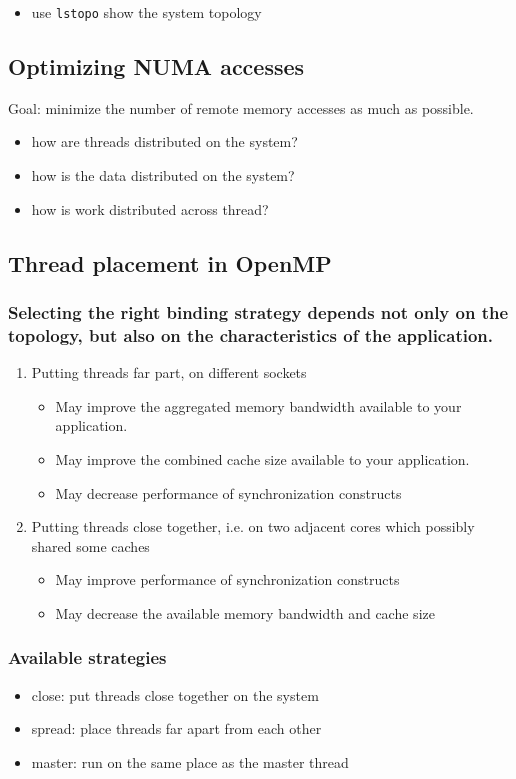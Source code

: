 \documentclass[11pt]{article}
\begin{document}
\begin{itemize}
\item use \verb~lstopo~ show the system topology
\end{itemize}
\subsection{Optimizing NUMA accesses}
\label{sec-1-2}
Goal: minimize the number of remote memory accesses as much as possible.
\begin{itemize}
\item how are threads distributed on the system?
\item how is the data distributed on the system?
\item how is work distributed across thread?
\end{itemize}

\subsection{Thread placement in OpenMP}
\label{sec-1-3}
\subsubsection{Selecting the right binding strategy depends not only on the topology, but also on the characteristics of the application.}
\label{sec-1-3-1}
\begin{enumerate}
\item Putting threads far part, on different sockets
\label{sec-1-3-1-1}
\begin{itemize}
\item May improve the aggregated memory bandwidth available to your application.
\item May improve the combined cache size available to your application.
\item May decrease performance of synchronization constructs
\end{itemize}
\item Putting threads close together, i.e. on two adjacent cores which possibly shared some caches
\label{sec-1-3-1-2}
\begin{itemize}
\item May improve performance of synchronization constructs
\item May decrease the available memory bandwidth and cache size
\end{itemize}
\end{enumerate}
\subsubsection{Available strategies}
\label{sec-1-3-2}
\begin{itemize}
\item close: put threads close together on the system
\item spread: place threads far apart from each other
\item master: run on the same place as the master thread
\end{itemize}
\end{document}
